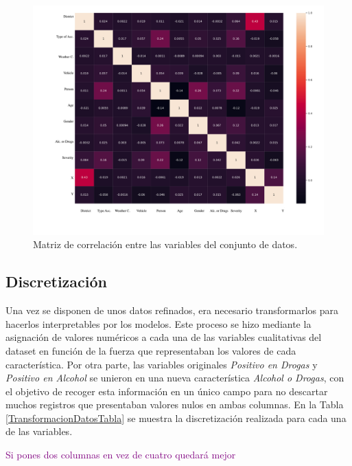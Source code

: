 \documentclass{uathesis-es}
\begin{document}
{		\begin{figure}[H]
			\centering
			\includegraphics[width=14cm]{Figures/1stPaper/CorrelationMatrix.png}
			\caption{Matriz de correlación entre las variables del conjunto de datos.}
			\label{CorrelationMatrix}
		\end{figure}
		
		
		\subsection*{Discretización}
		
		Una vez se disponen de unos datos refinados, era necesario transformarlos para hacerlos interpretables por los modelos. Este proceso se hizo mediante la asignación de valores numéricos a cada una de las variables cualitativas del dataset en función de la fuerza que representaban los valores de cada característica. Por otra parte, las variables originales \textit{Positivo en Drogas} y \textit{Positivo en Alcohol} se unieron en una nueva característica \textit{Alcohol o Drogas}, con el objetivo de recoger esta información en un único campo para no descartar muchos registros que presentaban valores nulos en ambas columnas. En la Tabla \ref{TransformacionDatosTabla} se muestra la discretización realizada para cada una de las variables.
		
		\textcolor{purple}{Si pones dos columnas en vez de cuatro quedará mejor}
		\begin{table}[ht]
			\centering
			\renewcommand{\arraystretch}{1.2}
			\small
			

\end{table}}
\end{document}
